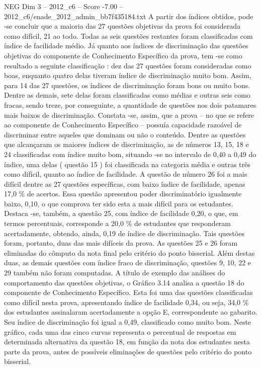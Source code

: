 \begin{textsample}{NEG Dim 3 – 2012\_c6 – Score -7.00 – 2012\_c6/enade\_2012\_admin\_bb7f435184.txt}
A partir dos índices obtidos, pode -se concluir que a maioria das 27 questões objetivas da prova foi considerada como difícil, 21 ao todo.
Todas as seis questões restantes foram classificadas com índice de facilidade médio.
Já quanto aos índices de discriminação das questões objetivas do componente de Conhecimento Específico da prova, tem -se como resultado a seguinte classificação : dez das 27 questões foram consideradas como boas, enquanto quatro delas tiveram índice de discriminação muito bom.
Assim, para 14 das 27 questões, os índices de discriminação foram bons ou muito bons.
Dentre as demais, sete delas foram classificadas como médias e outras seis como fracas, sendo treze, por conseguinte, a quantidade de questões nos dois patamares mais baixos de discriminação.
Constata -se, assim, que a prova – no que se refere ao componente de Conhecimento Específico – possuía capacidade razoável de discriminar entre aqueles que dominam ou não o conteúdo.
Dentre as questões que alcançaram os maiores índices de discriminação, as de números 13, 15, 18 e 24 classificadas com índice muito bom, situando -se no intervalo de 0,40 a 0,49 do índice, uma delas ( questão 15 ) foi classificada na categoria média e outras três como difícil, quanto ao índice de facilidade.
A questão de número 26 foi a mais difícil dentre as 27 questões específicas, com baixo índice de facilidade, apenas 17,0 \% de acertos.
Essa questão apresentou poder discriminatório igualmente baixo, 0,10, o que comprova ter sido esta a mais difícil para os estudantes.
Destaca -se, também, a questão 25, com índice de facilidade 0,20, o que, em termos percentuais, corresponde a 20,0 \% de estudantes que responderam acertadamente, obtendo, ainda, 0,19 de índice de discriminação.
Tais questões foram, portanto, duas das mais difíceis da prova.
As questões 25 e 26 foram eliminadas do cômputo da nota final pelo critério do ponto bisserial.
Além destas duas, as demais questões com índice fraco de discriminação, questões 9, 10, 22 e 29 também não foram computadas.
A título de exemplo das análises do comportamento das questões objetivas, o Gráfico 3.14 analisa a questão 18 do componente de Conhecimento Específico.
Esta foi uma das questões classificadas como difícil nesta prova, apresentando índice de facilidade 0,34, ou seja, 34,0 \% dos estudantes assinalaram acertadamente a opção E, correspondente ao gabarito.
Seu índice de discriminação foi igual a 0,49, classificado como muito bom.
Neste gráfico, cada uma das cinco curvas representa o percentual de respostas em determinada alternativa da questão 18, em função da nota dos estudantes nesta parte da prova, antes de possíveis eliminações de questões pelo critério do ponto bisserial.

\end{textsample}
